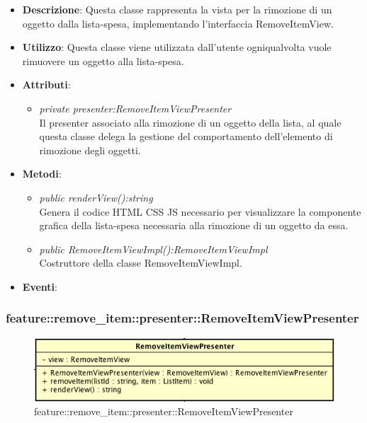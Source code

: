 \begin{itemize}
\item \textbf{Descrizione}: Questa classe rappresenta la vista per la rimozione di un oggetto dalla lista-spesa, implementando l'interfaccia RemoveItemView.
\item \textbf{Utilizzo}: Questa classe viene utilizzata dall'utente ogniqualvolta vuole rimuovere un oggetto alla lista-spesa.
\item \textbf{Attributi}: 
	\begin{itemize}
	\item \textit{private presenter:RemoveItemViewPresenter}\\
	Il presenter associato alla rimozione di un oggetto della lista, al quale questa classe delega la gestione del comportamento dell'elemento di rimozione degli oggetti.
	\end{itemize}
\item \textbf{Metodi}:
	\begin{itemize}
	\item \textit{public renderView():string}\\
		Genera il codice HTML CSS JS necessario per visualizzare la componente grafica della lista-spesa necessaria alla rimozione di un oggetto da essa.
	\item \textit{public RemoveItemViewImpl():RemoveItemViewImpl}\\
	Costruttore della classe RemoveItemViewImpl.
	\end{itemize}
\item \textbf{Eventi}:
\end{itemize}

\subsubsection{feature::remove\_item::presenter::RemoveItemViewPresenter}

\label{feature::remove_item::presenter::RemoveItemViewPresenter}
\begin{figure}[H]
	\centering
	\includegraphics[scale=0.5]{Sezioni/SottosezioniST/img/app/RemoveItemViewPresenter.png}
	\caption{feature::remove\_item::presenter::RemoveItemViewPresenter}
\end{figure}


